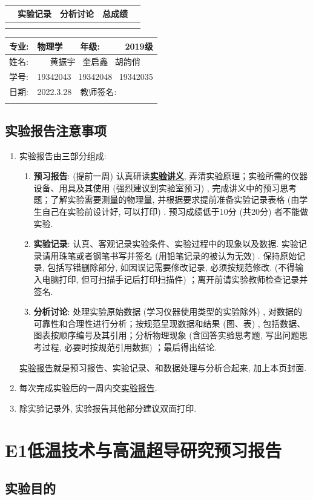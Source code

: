 \documentclass{ctexart}
\title{\experimentname}
\author{\stuID \student}
\date{\today}
\newcommand{\experimentname}{E1低温技术与高温超导研究}
\newcommand{\student}{黄振宇  \ 奎启鑫 \ 胡韵俏}
\newcommand{\Grade}{2019级}
\newcommand{\stuID}{19342043  \ 19342048 \ 19342035}
\newcommand{\previewdate}{2022.3.28}
\newcommand{\inlinemaketitle}{{\let\newpage\relax\maketitle}}
\theoremstyle{ansstyle}
\newcommand{\infotable}{%
	\begin{center}
		\begin{tabular}{|p{1.49cm}<{\centering}|p{1.49cm}<{\centering}|p{1.49cm}<{\centering}|p{1.49cm}<{\centering}|p{1.49cm}<{\centering}|p{1.49cm}<{\centering}|p{1.49cm}<{\centering}|p{1.49cm}<{\centering}|}
			\specialrule{0em}{0.3cm}{0cm}
			\hline
			\multicolumn{2}{|c|}{\LARGE 预习实验} & \multicolumn{2}{c|}{\LARGE 实验记录}& \multicolumn{2}{c|}{\LARGE 分析讨论} & \multicolumn{2}{c|}{\LARGE 总成绩} \\
			\hline
			&&&&&&& \\
			\hline
			\specialrule{0em}{0.3cm}{0cm}
		\end{tabular}
	\end{center}%
}
\newcommand{\previewdata}{%
	\begin{center}
		\begin{tabular}{|p{1.5cm}|p{4.5cm}|p{4cm}|p{3.65cm}|}
			\hline
			{\large 专业}:  & {\large 物理学}    & {\large 年级: }    & {\large \Grade} \\
			\hline
			{\large 姓名: } & \multicolumn{3}{c|}{\large \student} \\
			\hline
			{\large 学号: }  & \multicolumn{3}{c|}{\large \stuID} \\
			\hline
			{\large 日期: } & {\large \previewdate} & {\large 教师签名: } & \\
			\hline
			\specialrule{0em}{0.6cm}{0cm}
		\end{tabular}
	\end{center}%
}
\begin{document}
	\noindent
	\renewcommand\arraystretch{1.8}
	\infotable
	
	\renewcommand\arraystretch{1.3}
	\previewdata
	
	\inlinemaketitle
	\tableofcontents
	
	\subsection{实验报告注意事项}
	
	\begin{enumerate}
		\item 实验报告由三部分组成: 
		\begin{enumerate}
			\item \textbf{预习报告}: 
			(提前一周) 认真研读\underline{\textbf{实验讲义}}, 弄清实验原理；实验所需的仪器设备、用具及其使用 (强烈建议到实验室预习) , 完成讲义中的预习思考题；了解实验需要测量的物理量, 并根据要求提前准备实验记录表格 (由学生自己在实验前设计好, 可以打印) . 预习成绩低于10分 (共20分) 者不能做实验. 
			\item \textbf{实验记录}: 
			认真、客观记录实验条件、实验过程中的现象以及数据. 实验记录请用珠笔或者钢笔书写并签名 ({\color{red}用铅笔记录的被认为无效}) . {\color{red}保持原始记录, 包括写错删除部分, 如因误记需要修改记录, 必须按规范修改. } (不得输入电脑打印, 但可扫描手记后打印扫描件) ；离开前请实验教师检查记录并签名. 
			\item \textbf{分析讨论}: 
			处理实验原始数据 (学习仪器使用类型的实验除外) , 对数据的可靠性和合理性进行分析；按规范呈现数据和结果 (图、表) , 包括数据、图表按顺序编号及其引用；分析物理现象 (含回答实验思考题, 写出问题思考过程, 必要时按规范引用数据) ；最后得出结论. 
		\end{enumerate}
		\underline{实验报告}就是预习报告、实验记录、和数据处理与分析合起来, 加上本页封面. 
		\item 每次完成实验后的一周内交\underline{实验报告}. 
		\item 除实验记录外, 实验报告其他部分建议双面打印. 
	\end{enumerate}
	
	
	\section*{\experimentname 预习报告}
	
	\subsection{实验目的}
	
\end{document}
